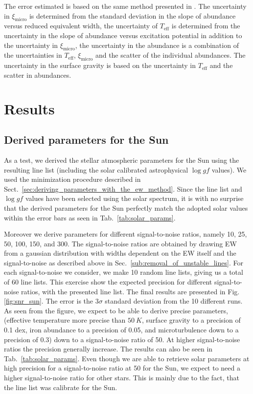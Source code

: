 \documentclass{aa}
\begin{document}
The error estimated is based on the same method presented in \citet{Gonzalez1998}.
The uncertainty in $\xi_\mathrm{micro}$ is determined from the standard deviation
in the slope of abundance versus reduced equivalent width, the uncertainty of
$T_\mathrm{eff}$ is determined from the uncertainty in the slope of abundance
versus excitation potential in addition to the uncertainty in $\xi_\mathrm{micro}$,
the uncertainty in the  abundance is a combination of the uncertainties
in $T_\mathrm{eff}$, $\xi_\mathrm{micro}$ and the scatter of the individual
 abundances. The uncertainty in the surface gravity is based on
the uncertainty in $T_\mathrm{eff}$ and the scatter in  abundances.


\section{Results}
\label{sec:results}

\subsection{Derived parameters for the Sun}
\label{sec:derived_parameters_of_the_sun}

As a test, we derived the stellar atmospheric parameters for the Sun using
the resulting line list (including the solar calibrated astrophysical
$\log \mathit{gf}$ values). We used the minimization procedure described
in Sect.~\ref{sec:deriving_parameters_with_the_ew_method}. Since the
line list and $\log\mathit{gf}$ values have been selected using the
solar spectrum, it is with no surprise that the derived parameters for
the Sun perfectly match the adopted solar values within the error bars
as seen in Tab.~\ref{tab:solar_params}.

Moreover we derive parameters for different signal-to-noise ratios,
namely 10, 25, 50, 100, 150, and 300. The signal-to-noise ratios
are obtained by drawing EW from a gaussian distribution with widths
dependent on the EW itself and the signal-to-noise as described above
in Sec.~\ref{sub:removal_of_unstable_lines}. For each signal-to-noise we
consider, we make 10 random line lists, giving us a total of 60 line lists. This
exercise show the expected precision for different signal-to-noise ratios,
with the presented line list. The final results are presented in
Fig.\ref{fig:snr_sun}. The error is the $3 \sigma$ standard deviation
from the 10 different runs. As seen from the figure, we expect to
be able to derive precise parameters, (effective temperature more
precise than $\SI{50}{K}$, surface gravity to a precision of 0.1 dex,
iron abundance to a precision of 0.05, and microturbulence down to a
precision of 0.3) down to a signal-to-noise ratio of 50. At higher
signal-to-noise ratios the precision generally increase. The results can
also be seen in Tab.~\ref{tab:solar_params}. Even though we are able
to retrieve solar parameters at high precision for a signal-to-noise ratio
at 50 for the Sun, we expect to need a higher signal-to-noise ratio
for other stars. This is mainly due to the fact, that the line list
was calibrate for the Sun.
\end{document}
